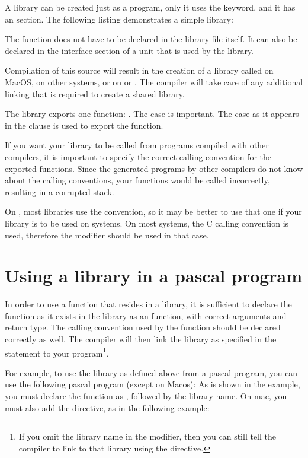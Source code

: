 A library can be created just as a program, only it uses the 
keyword, and it has an  section. The following listing
demonstrates a simple library:


The function  does not have to be declared in the library file
itself. It can also be declared in the interface section of a unit that
is used by the library.

Compilation of this source will result in the creation of a library called
 on MacOS,  on other \unix systems, 
or  on \windows or \ostwo.
The compiler will take care of any additional linking that is required to create a
shared library.

The library exports one function: . The case is important. The
case as it appears in the  clause is used to export the
function.

If you want your library to be called from programs compiled with
other compilers, it is important to specify the correct calling
convention for the exported functions. Since the generated programs
by other compilers do not know about the \fpc calling conventions,
your functions would be called incorrectly, resulting in a corrupted
stack.


On \windows, most libraries use the  convention, so it may be
better to use that one if your library is to be used on \windows systems. On
most \unix systems, the C calling convention is used, therefore the
 modifier should be used in that case.

\section{Using a library in a pascal program}

In order to use a function that resides in a library, it is sufficient to
declare the function as it exists in the library as an 
function, with correct arguments and return type. The calling convention
used by the function should be declared correctly as well. The compiler
will then link the library as specified in the  statement
to your program\footnote{If you omit the library name in the 
modifier, then you can still tell the compiler to link to that library using
the  directive.}.

For example, to use the library as defined above from a pascal program, you can use
the following pascal program (except on Macos):
As is shown in the example, you must declare the function as ,
followed by the library name. On mac, you must also add the
 directive, as in the following example:


